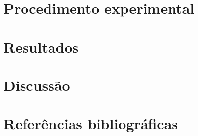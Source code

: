 \documentclass[12pt]{article}
\begin{document}
\newpage

\section{Procedimento experimental}

\newpage

\section{Resultados}

\newpage

\section{Discussão}

\newpage

\section*{Referências bibliográficas}
\begingroup
\renewcommand{\section}[2]{}

\endgroup
\end{document}
